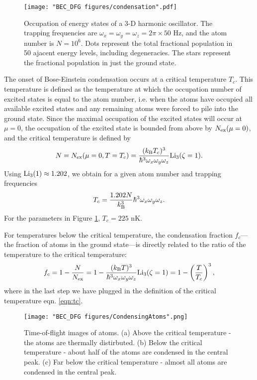 \begin{figure}
	\texttt{[image: "BEC\_DFG figures/condensation".pdf]}
\caption[Occupation of energy states of a 3-D harmonic oscillator]{Occupation of energy states of a 3-D harmonic oscillator. The trapping frequencies are $\omega_x=\omega_y=\omega_z=2\pi \times 50$ Hz, and the atom number is $N=10^6$. Dots represent the total fractional population in 50 ajacent energy levels, including degeneracies. The stars represent the fractional population in just the ground state.  }
\label{fig:BoseDistribution}
\end{figure}

The onset of Bose-Einstein condensation occurs at a critical temperature $T_c$. This temperature is defined as the temperature at which the occupation number of excited states is equal to the atom number, i.e. when the atoms have occupied all available excited states and any remaining atoms were forced to pile into the ground state. Since the maximal occupation of the excited states will occur at $\mu=0$, the occupation of the excited state is bounded from above by $N_{\rm ex}(\mu=0)$, and the critical temperature is defined by 
\begin{equation}
N=N_{\rm ex}(\mu=0, T=T_c)=\frac{(k_{\rm B}T_c)^3}{\hbar^3 \omega_x \omega_y \omega_z}{\rm Li}_3(\zeta=1).
\end{equation}
Using ${\rm Li}_3(1)\approx1.202$, we obtain for a given atom number and trapping frequencies
\begin{equation}
T_c = \frac{1.202 N}{k_{\rm B}^3}\hbar^3 \omega_x \omega_y \omega_z.
\label{eqn:tc}
\end{equation}
For the parameters in Figure \ref{fig:BoseDistribution}, $T_c = 225$ nK. 

For temperatures below the critical temperature, the condensation fraction $f_c$---the fraction of atoms in the ground state---is directly related to the ratio of the temperature to the critical temperature:
\begin{equation}
f_c=1-\frac{N}{N_{\rm ex}}=1-\frac{(k_{\rm B}T)^3}{\hbar^3 \omega_x \omega_y \omega_z}{\rm Li}_3(\zeta=1)=1-\left(\frac{T}{T_c}\right)^3,
\end{equation}
where in the last step we have plugged in the definition of the critical temperature eqn. \ref{eqn:tc}.

\begin{figure}
	\texttt{[image: "BEC\_DFG figures/CondensingAtoms".png]}
\caption[Time-of-flight images of atoms]{Time-of-flight images of atoms. (a) Above the critical temperature - the atoms are thermally distirbuted. (b) Below the critical temperature - about half of the atoms are condensed in the central peak. (c) Far below the critical temperature - almost all atoms are condensed in the central peak.}
\label{fig:CondensingAtoms}
\end{figure}

